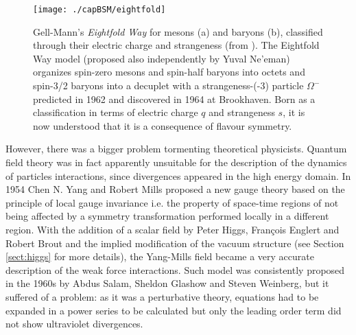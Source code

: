 \begin{figure}[htb]\begin{center}
\texttt{[image: ./capBSM/eightfold]}\caption{Gell-Mann's \textit{Eightfold Way} for mesons (a) and baryons (b), classified through their electric charge and strangeness (from \cite{Nature74}). The Eightfold Way model (proposed also independently by Yuval Ne'eman) organizes spin-zero mesons and spin-half baryons into octets and spin-3/2 baryons into a decuplet with a strangeness-(-3) particle $\Omega^{-}$ predicted in 1962 and discovered in 1964 at Brookhaven. Born as a classification in terms of electric charge $q$ and strangeness $s$, it is now understood that it is a consequence of flavour symmetry.}
\label{eightfold}\end{center}\end{figure}

However, there was a bigger problem tormenting theoretical physicists. Quantum field theory was in fact apparently unsuitable for the description of the dynamics of particles interactions, since divergences appeared in the high energy domain. In 1954 Chen N. Yang and Robert Mills proposed a new gauge theory based on the principle of local gauge invariance i.e. the property of space-time regions of not being affected by a symmetry transformation performed locally in a different region. With the addition of a scalar field by Peter Higgs, Fran\c{c}ois Englert and Robert Brout and the implied modification of the vacuum structure (see Section \ref{sect:higgs} for more details), the Yang-Mills field became a very accurate description of the weak force interactions. Such model was consistently proposed in the 1960s by Abdus Salam, Sheldon Glashow and Steven Weinberg, but it suffered of a problem: as it was a perturbative theory, equations had to be expanded in a power series to be calculated but only the leading order term did not show ultraviolet divergences.

